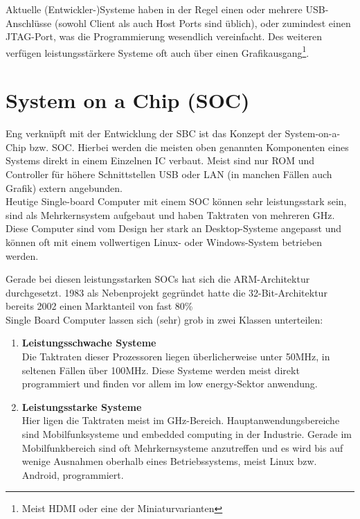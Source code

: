 \documentclass[12pt, twoside, a4paper]{scrbook}
\begin{document}
Aktuelle (Entwickler-)Systeme haben in der Regel einen oder mehrere USB-Anschlüsse (sowohl Client als auch Host Ports sind üblich), oder zumindest einen JTAG-Port, was die Programmierung wesendlich vereinfacht. Des weiteren verfügen leistungsstärkere Systeme oft auch über einen Grafikausgang\footnote{Meist HDMI oder eine der Miniaturvarianten}.\nocite{weiser1991}

\section{System on a Chip (SOC)}
Eng verknüpft mit der Entwicklung der SBC ist das Konzept der System-on-a-Chip bzw. SOC. Hierbei werden die meisten oben genannten Komponenten eines Systems direkt in einem Einzelnen IC verbaut. Meist sind nur ROM und Controller für höhere Schnittstellen USB oder LAN (in manchen Fällen auch Grafik) extern angebunden.\\

Heutige Single-board Computer mit einem SOC können sehr leistungsstark sein, sind als Mehrkernsystem aufgebaut und haben Taktraten von mehreren GHz. Diese Computer sind vom Design her stark an Desktop-Systeme angepasst und können oft mit einem vollwertigen Linux- oder Windows-System betrieben werden.

Gerade bei diesen leistungsstarken SOCs hat sich die ARM-Architektur durchgesetzt. 1983 als Nebenprojekt gegründet hatte die 32-Bit-Architektur bereits 2002 einen Marktanteil von fast 80\% \cite{stiller2002}\\

Single Board Computer lassen sich (sehr) grob in zwei Klassen unterteilen:

\begin{enumerate}
\item \textbf{Leistungsschwache Systeme}\\
Die Taktraten dieser Prozessoren liegen überlicherweise unter 50MHz, in seltenen Fällen über 100MHz. Diese Systeme werden meist direkt programmiert und finden vor allem im low energy-Sektor anwendung.
\item \textbf{Leistungsstarke Systeme}\\
Hier ligen die Taktraten meist im GHz-Bereich. Hauptanwendungsbereiche sind Mobilfunksysteme und embedded computing in der Industrie. Gerade im Mobilfunkbereich sind oft Mehrkernsysteme anzutreffen und es wird bis auf wenige Ausnahmen oberhalb eines Betriebssystems, meist Linux bzw. Android, programmiert.
\end{enumerate}
\end{document}
